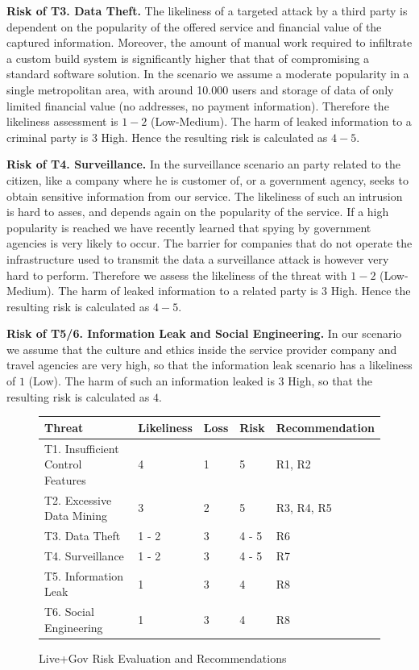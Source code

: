 \documentclass[runningheads,a4paper]{llncs}
\begin{document}
\textbf{Risk of T3. Data Theft.}
The likeliness of a targeted attack by a third party is dependent on
the popularity of the offered service and financial value of the
captured information. Moreover, the amount of manual work required to
infiltrate a custom build system is significantly higher that that of
compromising a standard software solution. In the scenario we assume a
moderate popularity in a single metropolitan area, with around 10.000
users and storage of data of only limited financial value (no
addresses, no payment information). Therefore the likeliness
assessment is $1-2$ (Low-Medium). The harm of leaked information to a criminal party is $3$ High. Hence the resulting risk is calculated as $4-5$.

\textbf{Risk of T4. Surveillance.}  In the surveillance scenario an party
related to the citizen, like a company where he is customer of, or a
government agency, seeks to obtain sensitive information from our
service. The likeliness of such an intrusion is hard to asses, and depends
again on the popularity of the service. If a high popularity is
reached we have recently learned that spying by government agencies is
very likely to occur. The barrier for companies that do not operate
the infrastructure used to transmit the data a surveillance attack is
however very hard to perform. Therefore we assess the likeliness of
the threat with $1-2$ (Low-Medium). The harm of leaked information to a related party is $3$ High. Hence the resulting risk is calculated as $4-5$.

\textbf{Risk of T5/6. Information Leak and Social Engineering.} In our scenario we assume that the culture and ethics inside the
service provider company and travel agencies are very high, so that
the information leak scenario has a likeliness of $1$ (Low). The harm of such an information leaked is $3$ High, so that the
resulting risk is calculated as $4$.


\begin{figure}
\centering
\begin{tabular}{|l|l|l|l|l|}
\hline
\textbf{Threat}                   & \textbf{Likeliness} & \textbf{Loss} & \textbf{Risk} & \textbf{Recommendation}
\\\hline
T1. Insufficient Control Features & 4                   & 1             & 5             & R1, R2
\\\hline
T2. Excessive Data Mining         & 3                   & 2             & 5             & R3, R4, R5
\\\hline
T3. Data Theft                    & 1 - 2               & 3             & 4 - 5         & R6
\\\hline
T4. Surveillance                  & 1 - 2               & 3             & 4 - 5         & R7
\\\hline
T5. Information Leak              & 1                   & 3             & 4             & R8
\\\hline
T6. Social Engineering            & 1                   & 3             & 4             & R8
\\\hline
\end{tabular}
\caption{Live+Gov Risk Evaluation and Recommendations}
\label{fig:risks}
\end{figure}
\end{document}
